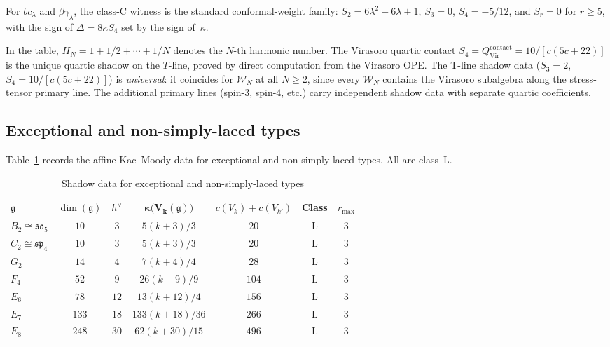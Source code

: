 \documentclass[11pt]{article}
\theoremstyle{plain}
\theoremstyle{definition}
\theoremstyle{remark}
\providecommand{\fg}{\mathfrak{g}}
\providecommand{\cW}{\mathcal{W}}
\begin{document}
\noindent
For $bc_\lambda$ and $\beta\gamma_\lambda$, the class-C witness is
the standard conformal-weight family:
$S_2=6\lambda^2-6\lambda+1$, $S_3=0$, $S_4=-5/12$, and
$S_r=0$ for $r\geq5$, with the sign of $\Delta=8\kappa S_4$
set by the sign of~$\kappa$.

\noindent
In the table, $H_N = 1 + 1/2 + \dotsb + 1/N$ denotes the
$N$-th harmonic number. The Virasoro quartic contact
$S_4 = Q^{\mathrm{contact}}_{\mathrm{Vir}} = 10/[c(5c+22)]$
is the unique quartic shadow on the $T$-line, proved by direct
computation from the Virasoro OPE. The T-line shadow data ($S_3 = 2$,
$S_4 = 10/[c(5c+22)]$) is \emph{universal}: it coincides for $\cW_N$
at all $N \geq 2$, since every $\cW_N$ contains the Virasoro
subalgebra along the stress-tensor primary line. The additional
primary lines (spin-$3$, spin-$4$, etc.) carry independent shadow
data with separate quartic coefficients.


\subsection{Exceptional and non-simply-laced types}\label{ssec:exceptional-table}

Table~\ref{tab:exceptional-shadow} records the affine Kac--Moody
data for exceptional and non-simply-laced types. All are class~L.

\begin{table}[ht]
\centering
\caption{Shadow data for exceptional and non-simply-laced types}
\label{tab:exceptional-shadow}
\renewcommand{\arraystretch}{1.35}
{\small
\begin{tabular}{lcccccc}
\toprule
$\fg$
 & $\dim(\fg)$
 & $h^\vee$
 & $\boldsymbol{\kappa\bigl(V_k(\fg)\bigr)}$
 & $c(V_k) + c(V_{k'})$
 & \textbf{Class}
 & $r_{\max}$ \\
\midrule
$B_2 \cong \mathfrak{so}_5$
 & $10$ & $3$ & $5(k{+}3)/3$ & $20$ & L & $3$ \\
$C_2 \cong \mathfrak{sp}_4$
 & $10$ & $3$ & $5(k{+}3)/3$ & $20$ & L & $3$ \\
$G_2$
 & $14$ & $4$ & $7(k{+}4)/4$ & $28$ & L & $3$ \\
$F_4$
 & $52$ & $9$ & $26(k{+}9)/9$ & $104$ & L & $3$ \\
$E_6$
 & $78$ & $12$ & $13(k{+}12)/4$ & $156$ & L & $3$ \\
$E_7$
 & $133$ & $18$ & $133(k{+}18)/36$ & $266$ & L & $3$ \\
$E_8$
 & $248$ & $30$ & $62(k{+}30)/15$ & $496$ & L & $3$ \\
\bottomrule
\end{tabular}
}
\end{table}
\end{document}
